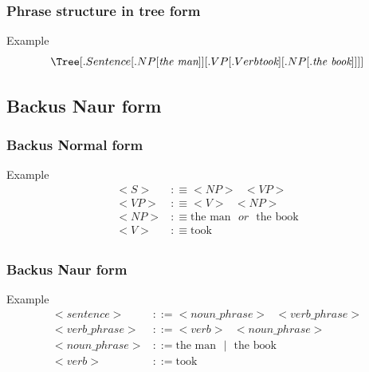 \documentclass{beamer}
\begin{document}
\begin{frame}
\frametitle{Phrase structure in tree form}
	\begin{exampleblock}{Example}
		\begin{equation*}
			\Tree[.Sentence [.NP [ \textit{the man} ]]
					  [.VP [.Verb \textit{took} ]
							[.NP [.\textit{the book} ]]]]
		\end{equation*}
	\end{exampleblock}
\end{frame}


\subsection{Backus Naur form}

\begin{frame}
	\frametitle{Backus Normal form}
	\begin{exampleblock}{Example}
		\begin{equation*}
		\begin{split}
		<S> &:\equiv<NP>\text{ }<VP> \\
		<VP> &:\equiv<V>\text{ }<NP> \\
		<NP> &:\equiv\text{the man}\text{ }\textit{or}\text{ }\text{the book} \\
		<V> &:\equiv\text{took} \\
		\end{split}
		\end{equation*}
	\end{exampleblock}
\end{frame}

\begin{frame}
\frametitle{Backus Naur form}
	\begin{exampleblock}{Example}
		\begin{equation*}
			\begin{split}
				<sentence> &::=<noun\_phrase>\text{ }<verb\_phrase> \\
				<verb\_phrase> &::=<verb>\text{ }<noun\_phrase> \\
				<noun\_phrase> &::=\text{the man}\text{ }|\text{ }\text{the book} \\
				<verb> &::=\text{took} \\
			\end{split}
		\end{equation*}
	\end{exampleblock}
\end{frame}
\end{document}
